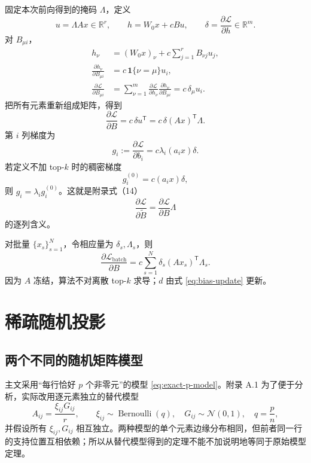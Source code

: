 \documentclass[11pt]{article}
\numberwithin{equation}{section}
\newcommand{\R}{\mathbb{R}}
\newcommand{\1}{\mathbf{1}}
\newcommand{\cN}{\mathcal{N}}
\newcommand{\cL}{\mathcal{L}}
\begin{document}
固定本次前向得到的掩码 $\Lambda$，定义
\begin{equation}
  u=\Lambda Ax\in\R^r,
  \qquad
  h=W_0x+cBu,
  \qquad
  \delta=\frac{\partial\cL}{\partial h}\in\R^m.
\end{equation}
对 $B_{\mu i}$，
\begin{align}
  h_\nu
  &=(W_0x)_\nu+c\sum_{j=1}^{r}B_{\nu j}u_j,\\
  \frac{\partial h_\nu}{\partial B_{\mu i}}
  &=c\,\1\{\nu=\mu\}u_i,\\
  \frac{\partial\cL}{\partial B_{\mu i}}
  &=\sum_{\nu=1}^{m}
    \frac{\partial\cL}{\partial h_\nu}
    \frac{\partial h_\nu}{\partial B_{\mu i}}
  =c\,\delta_\mu u_i.
\end{align}
把所有元素重新组成矩阵，得到
\begin{equation}
  \boxed{
  \frac{\partial\cL}{\partial B}
  =c\,\delta u^{\mathsf{T}}
  =c\,\delta (Ax)^{\mathsf{T}}\Lambda.}
  \label{eq:B-gradient}
\end{equation}
第 $i$ 列梯度为
\begin{equation}
  \boxed{
  g_i:=\frac{\partial\cL}{\partial b_i}
  =c\lambda_i(a_i x)\delta.}
  \label{eq:column-gradient}
\end{equation}
若定义不加 top-$k$ 时的稠密梯度
\begin{equation}
  g_i^{(0)}=c(a_i x)\delta,
\end{equation}
则 $g_i=\lambda_i g_i^{(0)}$。这就是附录式（14）
\begin{equation}
  \frac{\partial\cL}{\partial\widetilde B}
  =\frac{\partial\cL}{\partial B}\Lambda
\end{equation}
的逐列含义。

对批量 $\{x_s\}_{s=1}^{N}$，令相应量为 $\delta_s,\Lambda_s$，则
\begin{equation}
  \frac{\partial\cL_{\mathrm{batch}}}{\partial B}
  =c\sum_{s=1}^{N}\delta_s(Ax_s)^{\mathsf{T}}\Lambda_s.
\end{equation}
因为 $A$ 冻结，算法不对离散 top-$k$ 求导；$d$ 由式 \eqref{eq:bias-update} 更新。

\section{稀疏随机投影}

\subsection{两个不同的随机矩阵模型}

主文采用“每行恰好 $p$ 个非零元”的模型 \eqref{eq:exact-p-model}。附录 A.1 为了便于分析，实际改用逐元素独立的替代模型
\begin{equation}
  A_{ij}=\frac{\xi_{ij}G_{ij}}{r},
  \qquad
  \xi_{ij}\sim\operatorname{Bernoulli}(q),
  \quad
  G_{ij}\sim\cN(0,1),
  \quad q=\frac{p}{n},
  \label{eq:bernoulli-gaussian}
\end{equation}
并假设所有 $\xi_{ij},G_{ij}$ 相互独立。两种模型的单个元素边缘分布相同，但前者同一行的支持位置互相依赖；所以从替代模型得到的定理不能不加说明地等同于原始模型定理。
\end{document}

